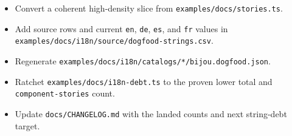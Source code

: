 \begin{itemize}
\tightlist
\item
  Convert a coherent high-density slice from \texttt{e\allowbreak{}x\allowbreak{}a\allowbreak{}m\allowbreak{}p\allowbreak{}l\allowbreak{}e\allowbreak{}s\allowbreak{}/\allowbreak{}d\allowbreak{}o\allowbreak{}c\allowbreak{}s\allowbreak{}/\allowbreak{}s\allowbreak{}t\allowbreak{}o\allowbreak{}r\allowbreak{}i\allowbreak{}e\allowbreak{}s\allowbreak{}.\allowbreak{}t\allowbreak{}s}.
\item
  Add source rows and current \texttt{e\allowbreak{}n}, \texttt{d\allowbreak{}e}, \texttt{e\allowbreak{}s}, and \texttt{f\allowbreak{}r} values in \texttt{e\allowbreak{}x\allowbreak{}a\allowbreak{}m\allowbreak{}p\allowbreak{}l\allowbreak{}e\allowbreak{}s\allowbreak{}/\allowbreak{}d\allowbreak{}o\allowbreak{}c\allowbreak{}s\allowbreak{}/\allowbreak{}i\allowbreak{}1\allowbreak{}8\allowbreak{}n\allowbreak{}/\allowbreak{}s\allowbreak{}o\allowbreak{}u\allowbreak{}r\allowbreak{}c\allowbreak{}e\allowbreak{}/\allowbreak{}d\allowbreak{}o\allowbreak{}g\allowbreak{}f\allowbreak{}o\allowbreak{}o\allowbreak{}d\allowbreak{}-\allowbreak{}s\allowbreak{}t\allowbreak{}r\allowbreak{}i\allowbreak{}n\allowbreak{}g\allowbreak{}s\allowbreak{}.\allowbreak{}c\allowbreak{}s\allowbreak{}v}.
\item
  Regenerate \texttt{e\allowbreak{}x\allowbreak{}a\allowbreak{}m\allowbreak{}p\allowbreak{}l\allowbreak{}e\allowbreak{}s\allowbreak{}/\allowbreak{}d\allowbreak{}o\allowbreak{}c\allowbreak{}s\allowbreak{}/\allowbreak{}i\allowbreak{}1\allowbreak{}8\allowbreak{}n\allowbreak{}/\allowbreak{}c\allowbreak{}a\allowbreak{}t\allowbreak{}a\allowbreak{}l\allowbreak{}o\allowbreak{}g\allowbreak{}s\allowbreak{}/\allowbreak{}*\allowbreak{}/\allowbreak{}b\allowbreak{}i\allowbreak{}j\allowbreak{}o\allowbreak{}u\allowbreak{}.\allowbreak{}d\allowbreak{}o\allowbreak{}g\allowbreak{}f\allowbreak{}o\allowbreak{}o\allowbreak{}d\allowbreak{}.\allowbreak{}j\allowbreak{}s\allowbreak{}o\allowbreak{}n}.
\item
  Ratchet \texttt{e\allowbreak{}x\allowbreak{}a\allowbreak{}m\allowbreak{}p\allowbreak{}l\allowbreak{}e\allowbreak{}s\allowbreak{}/\allowbreak{}d\allowbreak{}o\allowbreak{}c\allowbreak{}s\allowbreak{}/\allowbreak{}i\allowbreak{}1\allowbreak{}8\allowbreak{}n\allowbreak{}-\allowbreak{}d\allowbreak{}e\allowbreak{}b\allowbreak{}t\allowbreak{}.\allowbreak{}t\allowbreak{}s} to the proven lower total and \texttt{c\allowbreak{}o\allowbreak{}m\allowbreak{}p\allowbreak{}o\allowbreak{}n\allowbreak{}e\allowbreak{}n\allowbreak{}t\allowbreak{}-\allowbreak{}s\allowbreak{}t\allowbreak{}o\allowbreak{}r\allowbreak{}i\allowbreak{}e\allowbreak{}s} count.
\item
  Update \texttt{d\allowbreak{}o\allowbreak{}c\allowbreak{}s\allowbreak{}/\allowbreak{}C\allowbreak{}H\allowbreak{}A\allowbreak{}N\allowbreak{}G\allowbreak{}E\allowbreak{}L\allowbreak{}O\allowbreak{}G\allowbreak{}.\allowbreak{}m\allowbreak{}d} with the landed counts and next string-debt target.
\end{itemize}


